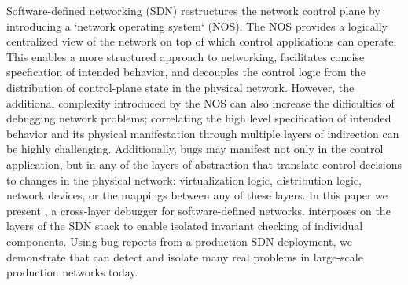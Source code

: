 Software-defined networking (SDN) restructures the network control plane
by introducing a `network operating system` (NOS). The NOS provides
a logically centralized view of the network on top of which control
applications can operate. This enables a more structured approach to
networking, facilitates concise specfication of intended behavior,
and decouples the control logic from the distribution of control-plane
state in the physical network.  However, the additional complexity
introduced by the NOS can also increase the difficulties of debugging
network problems; correlating the high level specification
of intended behavior and its physical manifestation through multiple
layers of indirection can be highly challenging. Additionally, bugs may manifest not only
in the control application, but in any of the layers of abstraction
that translate control decisions to changes in the physical network:
virtualization logic, distribution logic, network devices, or the mappings
between any of these layers. In this paper we present \projectname{},
a cross-layer debugger for software-defined networks. \projectname{}
interposes on the layers of the SDN stack to enable isolated invariant
checking of individual components. Using bug reports from a production
SDN deployment, we demonstrate that \projectname{} can detect and isolate
many real problems in large-scale production networks today.
